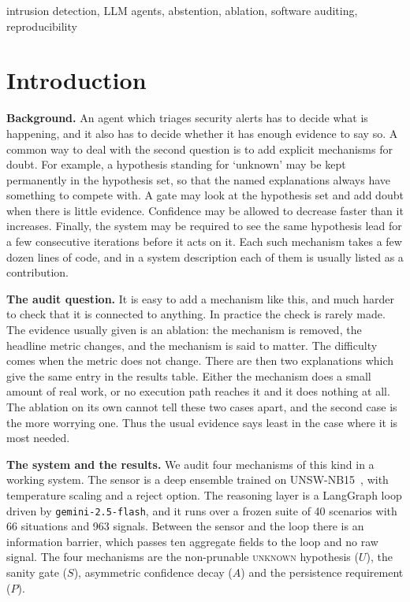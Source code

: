 \documentclass[conference]{IEEEtran}
\begin{document}
\begin{IEEEkeywords}
intrusion detection, LLM agents, abstention, ablation, software auditing,
reproducibility
\end{IEEEkeywords}

\section{Introduction}

\textbf{Background.}
An agent which triages security alerts has to decide what is happening, and it
also has to decide whether it has enough evidence to say so. A common way to
deal with the second question is to add explicit mechanisms for doubt. For
example, a hypothesis standing for `unknown' may be kept permanently in the
hypothesis set, so that the named explanations always have something to
compete with. A gate may look at the hypothesis set and add doubt when there
is little evidence. Confidence may be allowed to decrease faster than it
increases. Finally, the system may be required to see the same hypothesis lead
for a few consecutive iterations before it acts on it. Each such mechanism
takes a few dozen lines of code, and in a system description each of them is
usually listed as a contribution.

\textbf{The audit question.}
It is easy to add a mechanism like this, and much harder to check that it is
connected to anything. In practice the check is rarely made. The evidence
usually given is an ablation: the mechanism is removed, the headline metric
changes, and the mechanism is said to matter. The difficulty comes when the
metric does not change. There are then two explanations which give the same
entry in the results table. Either the mechanism does a small amount of real
work, or no execution path reaches it and it does nothing at all. The ablation
on its own cannot tell these two cases apart, and the second case is the more
worrying one. Thus the usual evidence says least in the case where it is most
needed.

\textbf{The system and the results.}
We audit four mechanisms of this kind in a working system. The sensor is a deep
ensemble trained on UNSW-NB15~\cite{moustafa2015}, with temperature scaling and
a reject option. The reasoning layer is a LangGraph loop driven by
\texttt{gemini-2.5-flash}, and it runs over a frozen suite of 40 scenarios with
66 situations and 963 signals. Between the sensor and the loop there is an
information barrier, which passes ten aggregate fields to the loop and no raw
signal. The four mechanisms are the non-prunable \textsc{unknown} hypothesis
($U$), the sanity gate ($S$), asymmetric confidence decay ($A$) and the
persistence requirement ($P$).
\end{document}
